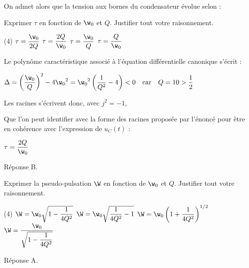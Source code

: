 \documentclass[a4paper, 12pt, final, garamond]{book}
\begin{document}
\enonce
{On admet alors que la tension aux bornes du condensateur évolue selon :

}

\QR
{Exprimer $\tau$ en fonction de $\w_0$ et $Q$. Justifier tout votre raisonnement.

\begin{tasks}[label=\protect\fbox{\Alph*}, label-width=4ex](4)
	\task $\tau=\f{\w_0}{2Q}$
	\task $\tau=\f{2Q}{\w_0}$
	\task $\tau=\f{\w_0}{Q}$
	\task $\tau=\f{Q}{\w_0}$
\end{tasks}
}
{
Le polynôme caractéristique associé à l’équation différentielle canonique s’écrit :


 {$\Delta=\left(\f{\w_0}{Q}\right)^2-4{\w_0}^2={{\w}_0}^2\left(\f{1}{Q^2}-4\right)<0 \quad \text{car} \quad Q=10>\f{1}{2}$}

Les racines s’écrivent donc, avec  $j^2=-1$,


Que l’on peut identifier avec la forme des racines proposée par l’énoncé pour être en cohérence avec l’expression de $u_C\left(t\right)$ :


             {$\tau=\f{2Q}{\w_0}$}

\medskip

\noindent
Réponse B.
}

\QR
{Exprimer la pseudo-pulsation $\W$ en fonction de $\w_0$ et $Q$. Justifier tout votre raisonnement.

	\begin{tasks}[label=\protect\fbox{\Alph*}, label-width=4ex,
			item-indent=-1em, column-sep=8em](4)
		\task $\W=\w_0\sqrt{1-\f{1}{4Q^2}}$
		\task $\W=\w_0\sqrt{\f{1}{4Q^2 }-1}$
		\task $\W=\w_0\left(1+\f{1}{4Q^2}\right)^{1/2}$
		\task $\W=\f{\w_0}{\sqrt{1-\f{1}{4Q^2}}}$
	\end{tasks}
}
{

	\medskip

	\noindent
	Réponse A.
}
\end{document}
